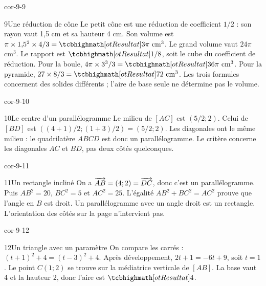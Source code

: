 \begin{blocLivre}{cor-9-9}
\begin{corrige}{9}{Une réduction de cône}
Le petit cône est une réduction de coefficient $1/2$ : son rayon vaut 1,5 cm et sa hauteur 4 cm. Son volume est $\pi\times1{,}5^2\times4/3=\res{3\pi\text{ cm}^3}$. Le grand volume vaut $24\pi$ cm$^3$. Le rapport est $\res{1/8}$, soit le cube du coefficient de réduction. Pour la boule, $4\pi\times3^3/3=\res{36\pi\text{ cm}^3}$. Pour la pyramide, $27\times8/3=\res{72\text{ cm}^3}$. Les trois formules concernent des solides différents ; l’aire de base seule ne détermine pas le volume.
\label{fig-cor-9-9}
\end{corrige}
\end{blocLivre}
\begin{blocLivre}{cor-9-10}
\begin{corrige}{10}{Le centre d’un parallélogramme}
Le milieu de $[AC]$ est $(5/2;2)$. Celui de $[BD]$ est $((4+1)/2;(1+3)/2)=(5/2;2)$. Les diagonales ont le même milieu : le quadrilatère $ABCD$ est donc un parallélogramme. Le critère concerne les diagonales $AC$ et $BD$, pas deux côtés quelconques.
\label{fig-cor-9-10}
\end{corrige}
\end{blocLivre}
\begin{blocLivre}{cor-9-11}
\begin{corrige}{11}{Un rectangle incliné}
On a $\overrightarrow{AB}=(4;2)=\overrightarrow{DC}$, donc c’est un parallélogramme. Puis $AB^2=20$, $BC^2=5$ et $AC^2=25$. L’égalité $AB^2+BC^2=AC^2$ prouve que l’angle en $B$ est droit. Un parallélogramme avec un angle droit est un rectangle. L’orientation des côtés sur la page n’intervient pas.
\label{fig-cor-9-11}
\end{corrige}
\end{blocLivre}
\begin{blocLivre}{cor-9-12}
\begin{corrige}{12}{Un triangle avec un paramètre}
On compare les carrés : $(t+1)^2+4=(t-3)^2+4$. Après développement, $2t+1=-6t+9$, soit $t=1$. Le point $C(1;2)$ se trouve sur la médiatrice verticale de $[AB]$. La base vaut 4 et la hauteur 2, donc l’aire est $\res4$.
\label{fig-cor-9-12}
\end{corrige}
\end{blocLivre}
